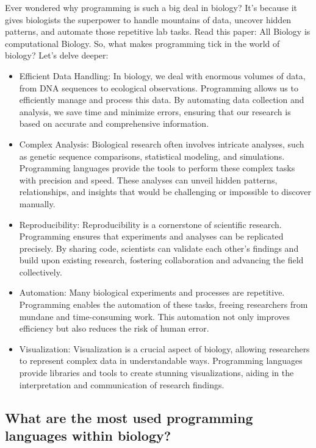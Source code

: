 \documentclass[
]{book}
\begin{document}
Ever wondered why programming is such a big deal in biology? It's because it gives biologists the superpower to handle mountains of data, uncover hidden patterns, and automate those repetitive lab tasks. Read this paper: All Biology is computational Biology. So, what makes programming tick in the world of biology? Let's delve deeper:

\begin{itemize}
\item
  Efficient Data Handling: In biology, we deal with enormous volumes of data, from DNA sequences to ecological observations. Programming allows us to efficiently manage and process this data. By automating data collection and analysis, we save time and minimize errors, ensuring that our research is based on accurate and comprehensive information.
\item
  Complex Analysis: Biological research often involves intricate analyses, such as genetic sequence comparisons, statistical modeling, and simulations. Programming languages provide the tools to perform these complex tasks with precision and speed. These analyses can unveil hidden patterns, relationships, and insights that would be challenging or impossible to discover manually.
\item
  Reproducibility: Reproducibility is a cornerstone of scientific research. Programming ensures that experiments and analyses can be replicated precisely. By sharing code, scientists can validate each other's findings and build upon existing research, fostering collaboration and advancing the field collectively.
\item
  Automation: Many biological experiments and processes are repetitive. Programming enables the automation of these tasks, freeing researchers from mundane and time-consuming work. This automation not only improves efficiency but also reduces the risk of human error.
\item
  Visualization: Visualization is a crucial aspect of biology, allowing researchers to represent complex data in understandable ways. Programming languages provide libraries and tools to create stunning visualizations, aiding in the interpretation and communication of research findings.
\end{itemize}

\hypertarget{what-are-the-most-used-programming-languages-within-biology}{%
\subsection{What are the most used programming languages within biology?}\label{what-are-the-most-used-programming-languages-within-biology}}
\end{document}
